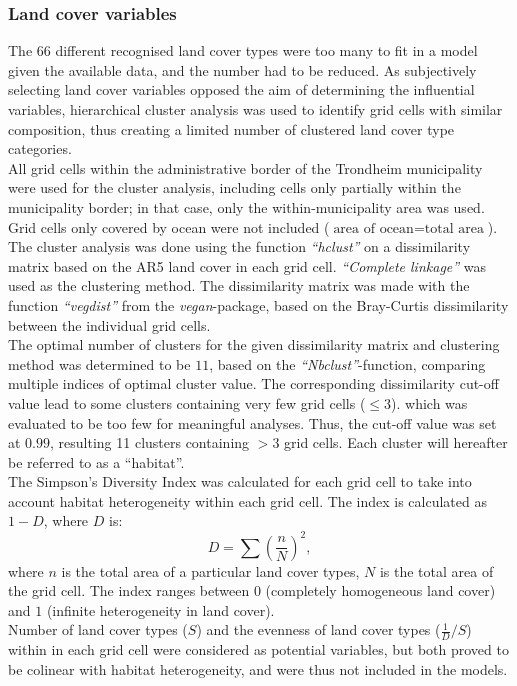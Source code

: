 \documentclass{article}
\begin{document}
\subsubsection{Land cover variables}
The 66 different recognised land cover types were too many to fit in a model given the available data, and the number had to be reduced. As subjectively selecting land cover variables opposed the aim of determining the influential variables, hierarchical cluster analysis was used to identify grid cells with similar composition, thus creating a limited number of clustered land cover type categories.\\
All grid cells within the administrative border of the Trondheim municipality were used for the cluster analysis, including cells only partially within the municipality border; in that case, only the within-municipality area was used. Grid cells only covered by ocean were not included ($\text{area of ocean} = \text{total area}$). The cluster analysis was done using the function \textit{``hclust''} on a dissimilarity matrix based on the AR5 land cover in each grid cell. \textit{``Complete linkage''} was used as the clustering method. The dissimilarity matrix was made with the function \textit{``vegdist''} from the \textit{vegan}-package, based on the Bray-Curtis dissimilarity between the individual grid cells.\\
The optimal number of clusters for the given dissimilarity matrix and clustering method was determined to be $11$, based on the \textit{``Nbclust''}-function, comparing multiple indices of optimal cluster value. The corresponding dissimilarity cut-off value lead to some clusters containing very few grid cells ($\leq{3}$). which was evaluated to be too few for meaningful analyses. Thus, the cut-off value was set at $0.99$, resulting 11 clusters containing $> 3$ grid cells.
Each cluster will hereafter be referred to as a ``habitat''.\\

The Simpson's Diversity Index was calculated for each grid cell to take into account habitat heterogeneity within each grid cell. The index is calculated as $1-D$, where $D$ is:
\begin{equation*}
    D = \sum (\frac{n}{N})^2 ,
\end{equation*}where $n$ is the total area of a particular land cover types, $N$ is the total area of the grid cell. The index ranges between $0$ (completely homogeneous land cover) and $1$ (infinite heterogeneity in land cover).\\
Number of land cover types ($S$) and the evenness of land cover types ($\frac{1}{D}/S$) within in each grid cell were considered as potential variables, but both proved to be colinear with habitat heterogeneity, and were thus not included in the models.\\
\end{document}
